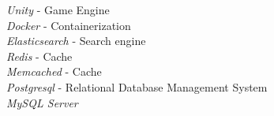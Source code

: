 \documentclass[10pt]{article} %
\begin{document}

{
\textit{Unity} - Game Engine\\
\textit{Docker} - Containerization \\
\textit{Elasticsearch} - Search engine\\
\textit{Redis} - Cache\\
\textit{Memcached} - Cache\\
\textit{Postgresql} - Relational Database Management System\\
\textit{MySQL Server}
}
\end{document}
